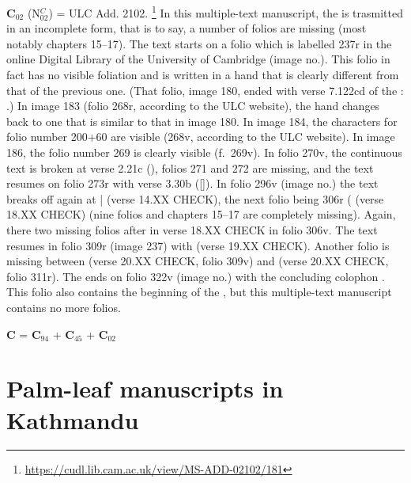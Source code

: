 \documentclass[11pt]{book} %
\begin{document}
{\large\textbf{C$_{\scriptscriptstyle 02}$} 
(N$^{\scriptscriptstyle C}_{\scriptscriptstyle 02}$)  =  
ULC Add. 2102.%
     \footnote{\url{https://cudl.lib.cam.ac.uk/view/MS-ADD-02102/181}}
In this multiple-text manuscript, the  is trasmitted in an incomplete form, that is to say, 
a number of folios are missing (most notably chapters 15--17). The text starts on a folio which is labelled 237r in 
the online Digital Library of the University of Cambridge (image no.). This folio in fact has no visible 
foliation and is written in a hand that is clearly different from that of the previous one.
(That folio, image 180, ended with verse 7.122cd of the :
.)
In image 183 (folio 268r, according to the ULC website), the hand changes back to one that is similar to that 
in image 180. In image 184, the characters for folio number 200+60 are visible (268v, according to the ULC website).
In image 186, the folio number 269 is clearly visible (f.\ 269v). In folio 270v, the continuous text is broken at
verse 2.21c (), folios 271 and 272 are missing, and the text resumes on folio 273r with verse 3.30b 
([]). In folio 296v (image no.) the text breaks off again at 
 |  (verse 14.XX CHECK), the next folio being 306r ( 
(verse 18.XX CHECK) (nine folios and chapters 15--17 are completely missing). 
Again, there two missing folios after  in
verse 18.XX CHECK in folio 306v. The text resumes in folio 309r (image 237) with 
(verse 19.XX CHECK). Another folio is missing between  (verse 20.XX CHECK, folio 309v) 
and  (verse 20.XX CHECK, folio 311r). The  ends on folio 322v 
(image no.) with the concluding colophon . This folio also contains the beginning
of the , but this multiple-text manuscript contains no more folios.

\medskip

{\large\textbf{C} } = 
{\large\textbf{C$_{\scriptscriptstyle 94}$}}
+
{\large\textbf{C$_{\scriptscriptstyle 45}$}} 
+
{\large\textbf{C$_{\scriptscriptstyle 02}$} }







\section{Palm-leaf manuscripts in Kathmandu}

}
\end{document}
